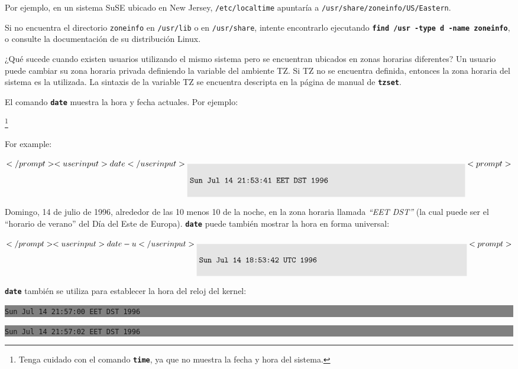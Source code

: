 \documentclass[12pt]{article}
\begin{document}
Por ejemplo, en un sistema SuSE ubicado en New Jersey, \texttt{/etc/localtime} apuntaría a \texttt{/usr/share/zoneinfo/US/Eastern}.



Si no encuentra el directorio \texttt{zoneinfo} en \texttt{/usr/lib} o en \texttt{/usr/share}, intente encontrarlo ejecutando
\texttt{\textbf{find /usr -type d -name zoneinfo}}, o consulte la documentación de su distribución Linux.



¿Qué sucede cuando existen usuarios utilizando el mismo sistema pero se encuentran ubicados en
zonas horarias diferentes?
Un usuario puede cambiar su zona horaria privada definiendo la variable del ambiente TZ.
Si TZ no se encuentra definida, entonces la zona horaria del sistema es la utilizada.
La sintaxis de la variable TZ se encuentra descripta en la página de manual de \texttt{\textbf{tzset}}.




El comando \texttt{\textbf{date}} muestra la hora y fecha actuales. Por ejemplo:

		\footnote{Tenga cuidado con el comando \texttt{\textbf{time}},
		ya que no muestra la fecha y hora del sistema.}

	For example:


$</prompt> <userinput>date</userinput>
\colorbox{grey}{\parbox[t]{0.95\linewidth}{ \vspace*{0.5cm} {\tt Sun Jul 14 21:53:41 EET DST 1996 } \vspace*{0.5cm} } } 
<prompt>$


Domingo, 14 de julio de 1996, alrededor de las 10 menos 10 de la noche, en la zona horaria llamada \textit{``EET DST''}
(la cual puede ser el ``horario de verano'' del Día del Este de Europa).
\texttt{\textbf{date}} puede también mostrar la hora en forma universal:



$</prompt> <userinput>date -u</userinput>
\colorbox{grey}{\parbox[t]{0.95\linewidth}{ \vspace*{0.5cm} {\tt Sun Jul 14 18:53:42 UTC 1996 } \vspace*{0.5cm} } } 
<prompt>$


	\texttt{\textbf{date}} también se utiliza para establecer la hora del reloj del kernel:
	


\colorbox{grey}{\parbox[t]{0.95\linewidth}{ \vspace*{0.5cm} {\tt Sun Jul 14 21:57:00 EET DST 1996 } \vspace*{0.5cm} } } 
\colorbox{grey}{\parbox[t]{0.95\linewidth}{ \vspace*{0.5cm} {\tt Sun Jul 14 21:57:02 EET DST 1996 } \vspace*{0.5cm} } } 
\end{document}

